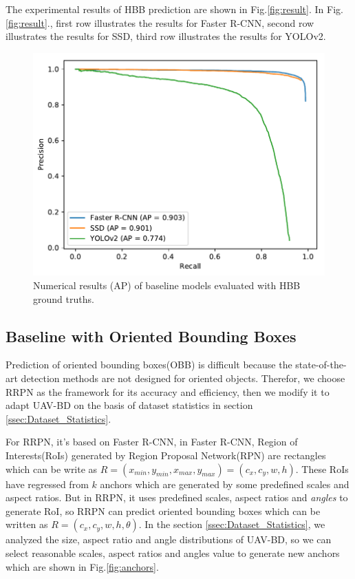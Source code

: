 The experimental results of HBB prediction are shown in Fig.\ref{fig:result}. In Fig.\ref{fig:result}., first row illustrates the results for Faster R-CNN, second row illustrates the results for SSD, third row illustrates the results for YOLOv2.


\begin{figure}
	\includegraphics[width=\linewidth]{images/pr_bbox.pdf}
	\caption{Numerical results (AP) of baseline models evaluated with HBB ground truths.}
	\label{fig:pr_bbox}
\end{figure}

\subsection{Baseline with Oriented Bounding Boxes}

Prediction of oriented bounding boxes(OBB) is difficult because the state-of-the-art detection methods are not designed for oriented objects. Therefor, we choose RRPN as the framework for its accuracy and efficiency, then we modify it to adapt UAV-BD on the basis of dataset statistics in section \ref{ssec:Dataset_Statistics}.
  
For RRPN, it's based on Faster R-CNN, in Faster R-CNN, Region of Interests(RoIs) generated by Region Proposal Network(RPN) are rectangles which can be write as $ R = (x_{min}, y_{min}, x_{max}, y_{max}) = (c_x, c_y, w, h) $. These RoIs have regressed from $ k $ anchors which are generated by some predefined scales and aspect ratios. But in RRPN, it uses predefined scales, aspect ratios and \textit{angles} to generate RoI, so RRPN can predict oriented bounding boxes which can be written as $ R=(c_x, c_y, w, h, \theta) $. In the section \ref{ssec:Dataset_Statistics}, we analyzed the size, aspect ratio and angle distributions of UAV-BD, so we can select reasonable scales, aspect ratios and angles value to generate new anchors which are shown in Fig.\ref{fig:anchors}. 

